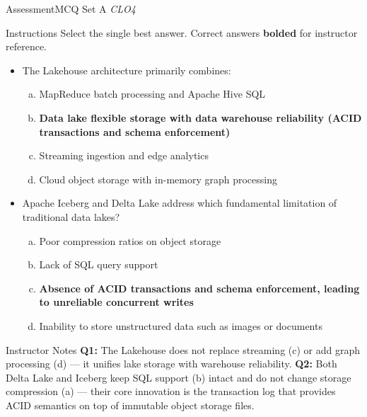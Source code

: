 \documentclass[aspectratio=169,10pt]{beamer}
\begin{document}
\begin{frame}{Assessment\textemdash MCQ Set A \hfill\small\textit{CLO4}}
  \begin{exampleblock}{Instructions}
    Select the single best answer.  Correct answers \textbf{bolded} for instructor reference.
  \end{exampleblock}
  \vspace{6pt}
  \begin{itemize}
    \item[\textbf{Q1.}] The Lakehouse architecture primarily combines:
    \begin{enumerate}[(a)]
      \item MapReduce batch processing and Apache Hive SQL
      \item \textbf{Data lake flexible storage with data warehouse reliability (ACID transactions and schema enforcement)}
      \item Streaming ingestion and edge analytics
      \item Cloud object storage with in-memory graph processing
    \end{enumerate}
  \end{itemize}
  \vspace{8pt}
  \begin{itemize}
    \item[\textbf{Q2.}] Apache Iceberg and Delta Lake address which fundamental limitation of traditional data lakes?
    \begin{enumerate}[(a)]
      \item Poor compression ratios on object storage
      \item Lack of SQL query support
      \item \textbf{Absence of ACID transactions and schema enforcement, leading to unreliable concurrent writes}
      \item Inability to store unstructured data such as images or documents
    \end{enumerate}
  \end{itemize}
  \vspace{6pt}
  \begin{alertblock}{Instructor Notes}
    \textbf{Q1:} The Lakehouse does not replace streaming (c) or add graph processing (d) --- it unifies lake storage with warehouse reliability.  \textbf{Q2:} Both Delta Lake and Iceberg keep SQL support (b) intact and do not change storage compression (a) --- their core innovation is the transaction log that provides ACID semantics on top of immutable object storage files.
  \end{alertblock}
\end{frame}
\end{document}
